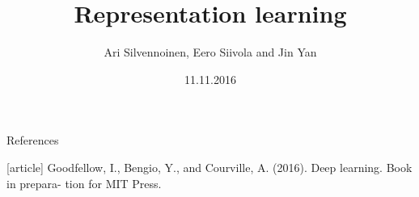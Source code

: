 \documentclass[first=purple,second=blue,logo=blueque]{./misc/aaltoslides}
\title{Representation learning}
\institute[~]{Aalto deep learning course}
\author[~]{Ari Silvennoinen, Eero Siivola and Jin Yan}
\date{11.11.2016}
\begin{document}
\aaltotitleframe




\begin{frame}{References}
\begin{thebibliography}{9}
[article]
Goodfellow, I., Bengio, Y., and Courville, A. (2016). Deep learning. Book in prepara-
tion for MIT Press.
\end{thebibliography}
\end{frame}
\end{document}
